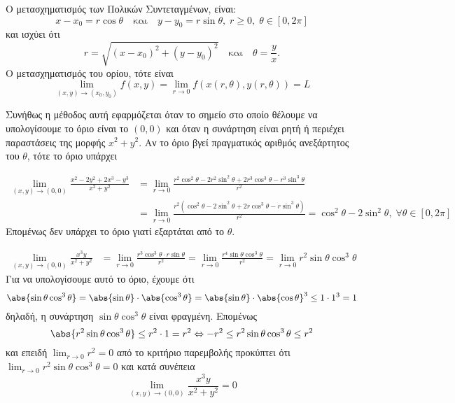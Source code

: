 \begin{rem}
\item {}
  \begin{myitemize}
    \item Ο μετασχηματισμός των Πολικών Συντεταγμένων, είναι:
      \[
        x - x_{0} = r \cos{\theta} \quad \text{και} \quad y - y_{0} = 
        r \sin{\theta}, \; r \geq 0, \; \theta \in [0, 2 \pi]
      \] 
      και ισχύει ότι 
      \[
        r = \sqrt{(x- x_{0})^{2}+(y- y_{0})^{2}} \quad \text{και} \quad \theta = 
        \frac{y}{x}.
      \] 
      Ο μετασχηματισμός του ορίου, τότε είναι 
      \[
        \lim\limits_{(x,y)\to (x_{0}, y_{0})} f(x,y) = 
        \lim_{r \to 0} f(x(r, \theta ), y(r, \theta)) = L
      \] 

    \item Συνήθως η μέθοδος αυτή εφαρμόζεται όταν το σημείο στο οποίο θέλουμε να 
      υπολογίσουμε το όριο είναι το $ (0,0) $ και όταν η συνάρτηση είναι ρητή ή 
      περιέχει παραστάσεις της μορφής $ x^{2}+y^{2} $. Αν το όριο βγεί 
      πραγματικός αριθμός ανεξάρτητος του $\theta$, τότε το όριο υπάρχει 
  \end{myitemize}
\end{rem}

\begin{example}
  \begin{align*} \lim\limits_{(x,y)\to (0, 0)} 
    \frac{x^{2}-2y^{2}+2x^{3}-y^{3}}{x^{2}+y^{2}} 
               &= \lim_{r \to 0} \frac{r^{2} \cos^{2}{\theta} - 2r^{2} \sin^{2}{\theta 
               +2r^{3} \cos^{3}{\theta - r^{3} \sin^{3}{\theta}}}}{r^{2}} \\ 
               &= \lim_{r \to 0} \frac{r^{2}(\cos^{2}{\theta} - 2 \sin^{2}{\theta} +2r 
               \cos^{3}{\theta} - r \sin^{3}{\theta})}{r^{2}} = 
               \cos^{2}{\theta} - 2 \sin^{2}{\theta}, \; \forall \theta \in [0, 2 \pi]
  \end{align*}
  Επομένως δεν υπάρχει το όριο γιατί εξαρτάται από το $\theta$.
\end{example}

\begin{example}
  \begin{align*}
    \lim\limits_{(x,y)\to (0, 0)} \frac{x^{3}y}{x^{2}+y^{2}} &= 
    \lim_{r \to 0} \frac{r^{3} \cos^{3}{\theta} \cdot r 
      \sin{\theta}}{r^{2}} = \lim_{r \to 0} \frac{r^{4} \sin{\theta} 
    \cos^{3}{\theta}}{r^{2}} = 
    \lim_{r \to 0} r^{2} \sin{\theta} \cos^{3}{\theta} 
  \end{align*}
  Για να υπολογίσουμε αυτό το όριο, έχουμε ότι
  \[
    \abs{\sin{\theta} \cos^{3}{\theta}} = \abs{\sin{\theta}} \cdot 
    \abs{\cos^{3}{\theta}} = \abs{\sin{\theta}} \cdot \abs{\cos{\theta}}^{3} \leq 
    1 \cdot 1^{3} = 1 
  \] 
  δηλαδή, η συνάρτηση $ \sin{\theta} \cos^{3}{\theta} $ είναι φραγμένη.
  Επομένως
  \[ 
    \abs{r^{2} \sin{\theta} \cos^{3}{\theta}} \leq r^{2} \cdot 1 = r^{2} \Leftrightarrow 
    -r^{2} \leq r^{2} \sin{\theta} \cos^{3}{\theta} \leq r^{2}
  \] 
  και επειδή $ \lim_{r \to 0} r^{2} = 0 $ από το κριτήριο παρεμβολής προκύπτει ότι 
  $ \lim_{r \to 0} r^{2} \sin{\theta} \cos^{3}{\theta} = 0 $ και κατά συνέπεια
  \[
    \lim\limits_{(x,y)\to (0,0)} \frac{x^{3}y}{x^{2}+y^{2}} = 0
  \] 
\end{example}


